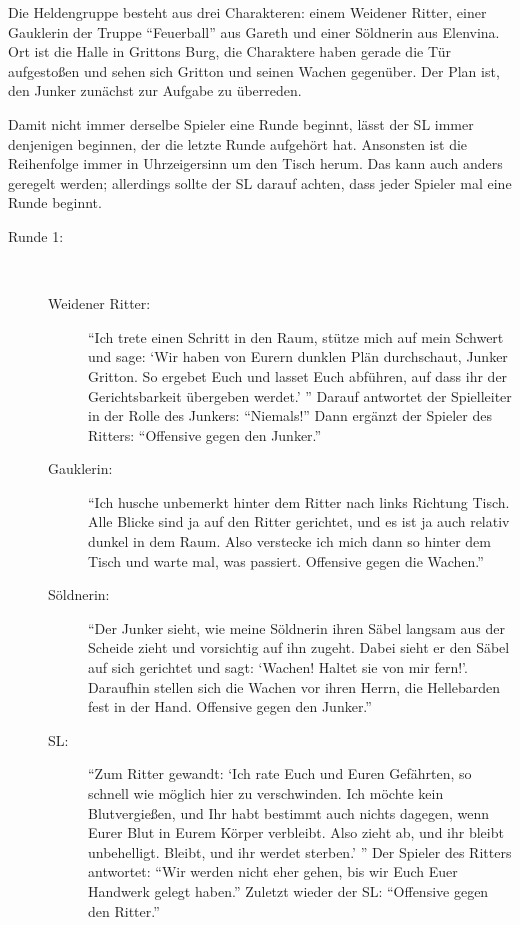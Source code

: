 Die Heldengruppe besteht aus drei Charakteren: einem Weidener Ritter, einer Gauklerin der Truppe ``Feuerball'' aus Gareth und einer Söldnerin aus Elenvina. Ort ist die Halle in Grittons Burg, die Charaktere haben gerade die Tür aufgestoßen und sehen sich Gritton und seinen Wachen gegenüber. Der Plan ist, den Junker zunächst zur Aufgabe zu überreden.

Damit nicht immer derselbe Spieler eine Runde beginnt, lässt der SL immer denjenigen beginnen, der die letzte Runde aufgehört hat. Ansonsten ist die Reihenfolge immer in Uhrzeigersinn um den Tisch herum. Das kann auch anders geregelt werden; allerdings sollte der SL darauf achten, dass jeder Spieler mal eine Runde beginnt.
\begin{description}
\item[Runde 1:]~
\begin{description}
  \item[Weidener Ritter:] ``Ich trete einen Schritt in den Raum, stütze mich auf mein Schwert und sage: `Wir haben von Eurern dunklen Plän durchschaut, Junker Gritton. So ergebet Euch und lasset Euch abführen, auf dass ihr der Gerichtsbarkeit übergeben werdet.' '' Darauf antwortet der Spielleiter in der Rolle des Junkers: ``Niemals!'' Dann ergänzt der Spieler des Ritters: ``Offensive gegen den Junker.''

  \item[Gauklerin:] ``Ich husche unbemerkt hinter dem Ritter nach links Richtung Tisch. Alle Blicke sind ja auf den Ritter gerichtet, und es ist ja auch relativ dunkel in dem Raum. Also verstecke ich mich dann so hinter dem Tisch und warte mal, was passiert. Offensive gegen die Wachen.''

  \item[Söldnerin:] ``Der Junker sieht, wie meine Söldnerin ihren Säbel langsam aus der Scheide zieht und vorsichtig auf ihn zugeht. Dabei sieht er den Säbel auf sich gerichtet und sagt: `Wachen! Haltet sie von mir fern!'. Daraufhin stellen sich die Wachen vor ihren Herrn, die Hellebarden fest in der Hand. Offensive gegen den Junker.''

  \item[SL:] ``Zum Ritter gewandt: `Ich rate Euch und Euren Gefährten, so schnell wie möglich hier zu verschwinden. Ich möchte kein Blutvergießen, und Ihr habt bestimmt auch nichts dagegen, wenn Eurer Blut in Eurem Körper verbleibt. Also zieht ab, und ihr bleibt unbehelligt. Bleibt, und ihr werdet sterben.' '' Der Spieler des Ritters antwortet: ``Wir werden nicht eher gehen, bis wir Euch Euer Handwerk gelegt haben.'' Zuletzt wieder der SL: ``Offensive gegen den Ritter.''
\end{description}


\end{description}

